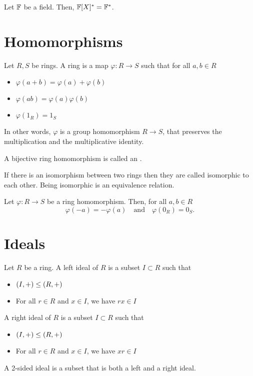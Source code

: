 \documentclass[11pt]{penrose}
\begin{document}
\begin{nlemma}
    Let $\mathbb{F}$ be a field. Then, $\mathbb{F}[X]^* = \mathbb{F}^*$.
\end{nlemma}

\section{Homomorphisms}

\begin{ndfn}
    Let $R, S$ be rings. A ring  is a map $\varphi : R \to S$ such that for all $a, b \in R$
    \begin{itemize}
        \item $\varphi(a + b) = \varphi(a) + \varphi(b)$
        \item $\varphi(ab) = \varphi(a)\varphi(b)$
        \item $\varphi(1_R) = 1_S$
    \end{itemize}
    In other words, $\varphi$ is a group homomorphism $R \to S$, that preserves the multiplication and the multiplicative identity.
\end{ndfn}

\begin{ndfn}
    A bijective ring homomorphism is called an .
\end{ndfn}

\begin{remark}
    If there is an isomorphism between two rings then they are called isomorphic to each other. Being isomorphic is an equivalence relation.
\end{remark}

\begin{nthm}
    Let $\varphi : R \to S$ be a ring homomorphism. Then, for all $a, b \in R$
    \begin{equation*}
        \varphi(-a) = -\varphi(a)
        \quad\text{and}\quad
        \varphi(0_R) = 0_S.
    \end{equation*}
\end{nthm}

\section{Ideals}

\begin{ndfn}
    Let $R$ be a ring. A left ideal of $R$ is a subset $I \subset R$ such that
    \begin{itemize}
        \item $(I,+) \mathrel{\leq} (R,+)$
        \item For all $r \in R$ and $x \in I$, we have $rx \in I$
    \end{itemize}
    A right ideal of $R$ is a subset $I \subset R$ such that
    \begin{itemize}
        \item $(I,+) \mathrel{\leq} (R,+)$
        \item For all $r \in R$ and $x \in I$, we have $xr \in I$
    \end{itemize}
    A 2-sided ideal is a subset that is both a left and a right ideal.
\end{ndfn}
\end{document}
